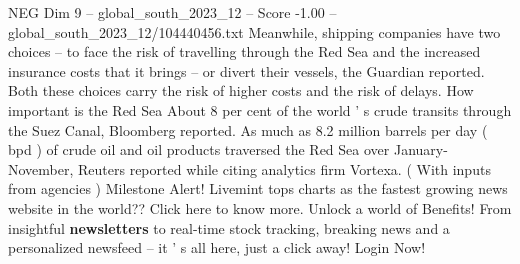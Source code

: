 \begin{textsample}{NEG Dim 9 – global\_south\_2023\_12 – Score -1.00 – global\_south\_2023\_12/104440456.txt}
Meanwhile, shipping companies have two choices -- to face the risk of travelling through the Red Sea and the increased insurance costs that it brings -- or divert their vessels, the Guardian reported.
Both these choices carry the risk of higher costs and the risk of delays.
How important is the Red Sea About 8 per cent of the world ' s crude transits through the Suez Canal, Bloomberg reported.
As much as 8.2 million barrels per day ( bpd ) of crude oil and oil products traversed the Red Sea over January-November, Reuters reported while citing analytics firm Vortexa. ( With inputs from agencies ) Milestone Alert!
Livemint tops charts as the fastest growing news website in the world??
Click here to know more.
Unlock a world of Benefits!
From insightful \textbf{newsletters} to real-time stock tracking, breaking news and a personalized newsfeed -- it ' s all here, just a click away!
Login Now!

\end{textsample}
